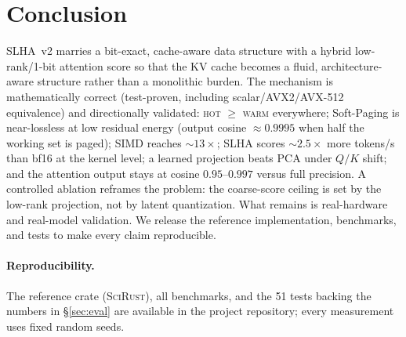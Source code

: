 \documentclass[11pt]{article}
\theoremstyle{plain}
\theoremstyle{definition}
\begin{document}
\section{Conclusion}
\label{sec:conclusion}
SLHA~v2 marries a bit-exact, cache-aware data structure with a hybrid
low-rank/1-bit attention score so that the KV cache becomes a fluid,
architecture-aware structure rather than a monolithic burden. The
mechanism is mathematically correct (test-proven, including
scalar/AVX2/AVX-512 equivalence) and directionally validated:
\textsc{hot} $\ge$ \textsc{warm} everywhere; Soft-Paging is near-lossless
at low residual energy (output cosine $\approx 0.9995$ when half the
working set is paged); SIMD reaches $\sim\!13\times$;
SLHA scores $\sim\!2.5\times$ more tokens/s than bf16 at the kernel
level; a learned projection beats PCA under $Q/K$ shift; and the
attention output stays at cosine $0.95$--$0.997$ versus full precision. A
controlled ablation reframes the problem: the coarse-score ceiling is set
by the low-rank projection, not by latent quantization. What remains is
real-hardware and real-model validation. We release the reference
implementation, benchmarks, and tests to make every claim reproducible.

\paragraph{Reproducibility.}
The reference crate (\textsc{SciRust}), all benchmarks, and the 51 tests
backing the numbers in \S\ref{sec:eval} are available in the project
repository; every measurement uses fixed random seeds.
\end{document}
